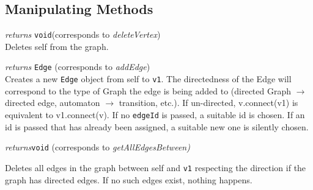\subsection{Manipulating Methods}
\begin{description}
\label{deleteVertexClass}\item[delete()] \emph{returns} \texttt{void}(corresponds to \textit{deleteVertex})\\
Deletes self from the graph.

\label{addEdgeClass}\item[connect(Vertex: v1, {[Integer: edgeId]})] \emph{returns} \texttt{Edge} (corresponds to \textit{addEdge})\\
Creates a new \texttt{Edge} object from self to \texttt{v1}. The directedness of the Edge will correspond to the type of Graph the edge is being added to (directed Graph $\to$ directed edge, automaton $\to$ transition, etc.). If un-directed, v.connect(v1) is equivalent to v1.connect(v). If no \texttt{edgeId}
is passed, a suitable id is chosen. If an id is passed that has
already been assigned, a suitable new one is silently chosen.

\label{getAllEdgesBetweenClass}\item[getAllEdgesBetween(Vertex: v1)] \emph{returns}\texttt{void} (corresponds to \textit{getAllEdgesBetween)}

Deletes all edges in the graph
between self and \texttt{v1} respecting
the direction if the graph has directed edges.
If no such edges exist, nothing happens.


\end{description}
